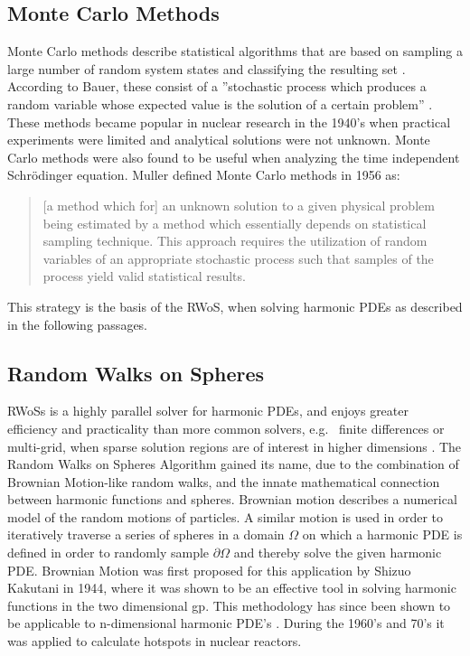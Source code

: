 \subsection{Monte Carlo Methods}\label{ssec:montecarlo}
Monte Carlo methods describe statistical algorithms that are based on sampling a
large number of random system states and classifying the resulting set \cite{Metropolis}.
According to Bauer, these consist of a ''stochastic process which produces a random variable
 whose expected value is the solution of a certain problem'' \cite{bauer}.
These methods became popular in nuclear research in the 1940's when practical
experiments were limited and analytical solutions were not unknown.  Monte Carlo
methods were also found to be useful when analyzing the time independent Schr\"odinger
equation\cite{Metropolis}. Muller defined Monte Carlo methods in 1956 as:
\begin{quote}[a method which for] an unknown solution to a given physical
problem being estimated by a method which essentially depends on statistical sampling technique.
This approach requires the utilization of random variables of an appropriate
stochastic process such that samples of the process yield valid statistical
results\cite{Muller}.\end{quote}
This strategy is the basis of the \Gls{RWoS}, when solving harmonic
\Glspl{PDE} as described in the following passages.
\subsection{Random Walks on Spheres}\label{ssec:RWoS}
 \Glspl{RWoS} is a highly parallel solver for harmonic \Glspl{PDE},
and enjoys greater efficiency and practicality than more common solvers, e.g.~
finite differences or multi-grid, when sparse solution regions are of
interest in higher dimensions \cite{DeLaurentis,Bornemann,Yang}.
The Random Walks on Spheres Algorithm
gained its name, due to the combination of Brownian Motion-like random walks,
and the innate mathematical connection between
harmonic functions and spheres\cite{Axler1992}.
Brownian motion describes a numerical model
of the random motions of particles.  A similar motion is used in order to iteratively
traverse a series %
of spheres in a domain $\Omega$ on which a harmonic PDE is defined in order to
randomly sample $\partial \Omega$ and thereby %
solve the given harmonic PDE\cite{DeLaurentis}.
Brownian Motion
was first
proposed for this application by Shizuo Kakutani in 1944\cite{kakutani},
where it was shown to be an effective tool
in solving harmonic functions in the two dimensional \Gls{gp}. This methodology has since been
shown to be applicable to n-dimensional harmonic PDE's \cite{DeLaurentis}.  During the 1960's
and 70's it was applied to calculate hotspots in nuclear reactors\cite{Bornemann}.

